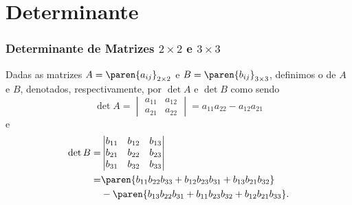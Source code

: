 \section{Determinante}


\begin{frame}
    \frametitle{Determinante de Matrizes $2 \times 2$ e $3 \times 3$}
    
    \begin{definicao}\label{detbasicos}
        Dadas as matrizes  $ A = \paren{a_{ij}}_{2 \times 2}$ e $ B = \paren{b_{ij}}_{3 \times 3}$, definimos o  de $A$ e $B$, denotados, respectivamente, por $\det A$ e $\det B$ como sendo
        \begin{displaymath} \det A = 
            \begin{vmatrix}
                 a_{11} & a_{12} \\
                 a_{21} &  a_{22}
            \end{vmatrix} = a_{11}a_{22} - a_{12}a_{21}
        \end{displaymath}
        e
        \begin{align*}    \det B =&
            \begin{vmatrix}
                b_{11} & b_{12} & b_{13} \\
                b_{21} & b_{22} & b_{23} \\
                b_{31} & b_{32} & b_{33}
            \end{vmatrix} \\
            =& \paren{b_{11}b_{22}b_{33} + b_{12}b_{23}b_{31} + b_{13}b_{21}b_{32}} \\ 
            & - \paren{b_{13}b_{22}b_{31} + b_{11}b_{23}b_{32} + b_{12}b_{21}b_{33}}.
        \end{align*}
    \end{definicao}
\end{frame}


